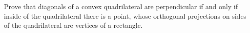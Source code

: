 Prove that diagonals of a convex quadrilateral are perpendicular if and only if inside of the quadrilateral there is a point, whose orthogonal projections on sides of the quadrilateral are vertices of a rectangle.
